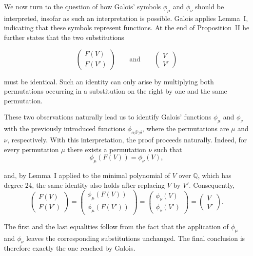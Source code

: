 \documentclass[a4paper,11pt]{article}
\begin{document}
 We now turn to the question of how Galois' symbols \(\phi_\mu\) and \(\phi_\nu\) should be interpreted, insofar as such an interpretation is possible. Galois applies Lemma~I, indicating that these symbols represent functions. At the end of Proposition~II he further states that the two substitutions
 
 \[
 \begin{pmatrix}
 	F(V)\\
 	F(V')
 \end{pmatrix}
 \qquad\text{and}\qquad
 \begin{pmatrix}
 	V\\
 	V'
 \end{pmatrix}
 \]
 
 must be identical. Such an identity can only arise by multiplying both permutations occurring in a substitution on the right by one and the same permutation.
 
 These two observations naturally lead us to identify Galois' functions \(\phi_\mu\) and \(\phi_\nu\) with the previously introduced functions \(\phi_{\alpha\beta\gamma\delta}\), where the permutations are \(\mu\) and \(\nu\), respectively. With this interpretation, the proof proceeds naturally. Indeed, for every permutation \(\mu\) there exists a permutation \(\nu\) such that
  \[
 \phi_\mu(F(V))=\phi_\nu(V),
 \]
 
 and, by Lemma~I applied to the minimal polynomial of \(V\) over \(\mathbb{Q}\), which has degree \(24\), the same identity also holds after replacing \(V\) by \(V'\). 
 Consequently, 
 \[
 \begin{pmatrix}
 	F(V)\\
 	F(V')
 \end{pmatrix}
 =
 \begin{pmatrix}
 	\phi_\mu(F(V))\\
 	\phi_\mu(F(V'))
 \end{pmatrix}
 =
 \begin{pmatrix}
 	\phi_\nu(V)\\
 	\phi_\nu(V')
 \end{pmatrix}
 =
 \begin{pmatrix}
 	V\\
 	V'
 \end{pmatrix}.
 \]
 
 The first and the last equalities follow from the fact that the application of \(\phi_\mu\) and \(\phi_\nu\) leaves the corresponding substitutions unchanged. The final conclusion is therefore exactly the one reached by Galois.
 
\end{document}
